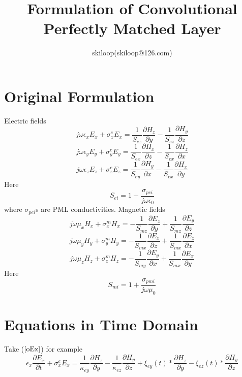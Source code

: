 \documentclass[a4paper,10pt]{article}
\title{Formulation of Convolutional Perfectly Matched Layer}
\author{skiloop(skiloop@126.com)}
\begin{document}
\maketitle
\section{Original Formulation}
Electric fields
\begin{equation}\label{oEx}
j\omega\epsilon_{x}E_{x}+\sigma^{e}_{x}E_{x}=\frac{1}{S_{ez}}\frac{\partial H_{z}}{\partial y}-\frac{1}{S_{ez}}\frac{\partial H_{y}}{\partial z}
\end{equation}
\begin{equation}\label{oEy}
j\omega\epsilon_{y}E_{y}+\sigma^{e}_{y}E_{y}=\frac{1}{S_{ex}}\frac{\partial H_{x}}{\partial z}-\frac{1}{S_{ex}}\frac{\partial H_{z}}{\partial x}
\end{equation}
\begin{equation}\label{oEz}
j\omega\epsilon_{z}E_{z}+\sigma^{e}_{z}E_{z}=\frac{1}{S_{ey}}\frac{\partial H_{y}}{\partial x}-\frac{1}{S_{ex}}\frac{\partial H_{x}}{\partial y}
\end{equation}
Here
\begin{equation}
S_{ei}=1+\frac{\sigma_{pei}}{j\omega\epsilon_{0}}
\end{equation}
where $\sigma_{pei}$s are PML conductivities. \newline
Magnetic fields
\begin{equation}\label{oHx}
j\omega\mu_{x}H_{x}+\sigma^{m}_{x}H_{x}=-\frac{1}{S_{mz}}\frac{\partial E_{z}}{\partial y}+\frac{1}{S_{mz}}\frac{\partial E_{y}}{\partial z}
\end{equation}
\begin{equation}\label{oHy}
j\omega\mu_{y}H_{y}+\sigma^{m}_{y}H_{y}=-\frac{1}{S_{mx}}\frac{\partial E_{x}}{\partial z}+\frac{1}{S_{mx}}\frac{\partial E_{z}}{\partial x}
\end{equation}
\begin{equation}\label{oHz}
j\omega\mu_{z}H_{z}+\sigma^{m}_{z}H_{z}=-\frac{1}{S_{my}}\frac{\partial E_{y}}{\partial x}+\frac{1}{S_{mx}}\frac{\partial E_{x}}{\partial y}
\end{equation}
Here
\begin{equation}
S_{mi}=1+\frac{\sigma_{pmi}}{j\omega\mu_{0}}
\end{equation}
\section{Equations in Time Domain}
Take ($\ref{oEx}$) for example
\begin{equation}\label{exTD}
\epsilon_{x}\frac{\partial E_{x}}{\partial t}+\sigma^{e}_{x}E_{x}=\frac{1}{\kappa_{ey}}
\frac{\partial H_{z}}{\partial y}-\frac{1}{\kappa_{ez}}\frac{\partial H_{y}}{\partial z}+
\xi_{ey}(t)*\frac{\partial H_{z}}{\partial y}-\xi_{ez}(t)*\frac{\partial H_{y}}{\partial z}
\end{equation}
\end{document}
